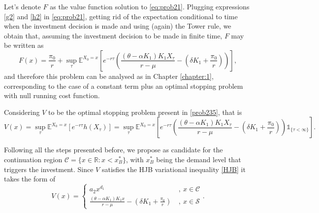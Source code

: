 Let's denote $F$ as the value function solution to \eqref{eq:prob21}. Plugging expressions \eqref{g2} and \eqref{h2} in \eqref{eq:prob21}, getting rid of the expectation conditional to time when the investment decision is made and using (again) the Tower rule, we obtain that, assuming the investment decision to be made in finite time, $F$ may be written as
\begin{equation}
F(x)=\frac{\pi_0}{r}+ \sup _\tau \mathds{E}^{X_0=x} \left[ e^{-r\tau}\left(\frac{(\theta-\alpha K_1)K_1 X_\tau}{r-\mu} - \left( \delta K_1  +\frac{\pi_0}{r}\right)  \right) \right],
\label{prob235}
\end{equation}
and therefore this problem can be analysed as in Chapter \ref{chapter:1}, corresponding to the case of a constant term plus an optimal stopping problem with null running cost function. 

Considering $V$ to be the optimal stopping problem present in \eqref{prob235}, that is
\begin{equation}
V(x)=  \sup _\tau \mathds{E}^{X_0=x} \left[ e^{-r\tau}h(X_\tau) \right] 
=\sup _\tau \mathds{E}^{X_0=x} \left[ e^{-r\tau}\left(\frac{(\theta-\alpha K_1)K_1 X_\tau}{r-\mu} - \left( \delta K_1  +\frac{\pi_0}{r}\right)  \right) \mathds{1}_{ \{\tau < \infty \} }\right].
\end{equation} 

Following all the steps presented before, we propose as candidate for the continuation region $\mathcal{C}=\{x \in \mathds{R}: x<x_B^* \}$, with $x^*_B$ being the demand level that triggers the investment. Since $V$ satisfies the HJB variational inequality \eqref{HJB} it takes the form of
\begin{equation}
V(x)=\begin{cases} a_2 x^{d_1} &\ , \ x \in \mathcal{C} \\
\frac{(\theta-\alpha K_1)K_1 x}{r-\mu} - \left( \delta K_1  +\frac{\pi_0}{r}\right) &\ , \ x \in \mathcal{S}
\end{cases}.
\end{equation}

